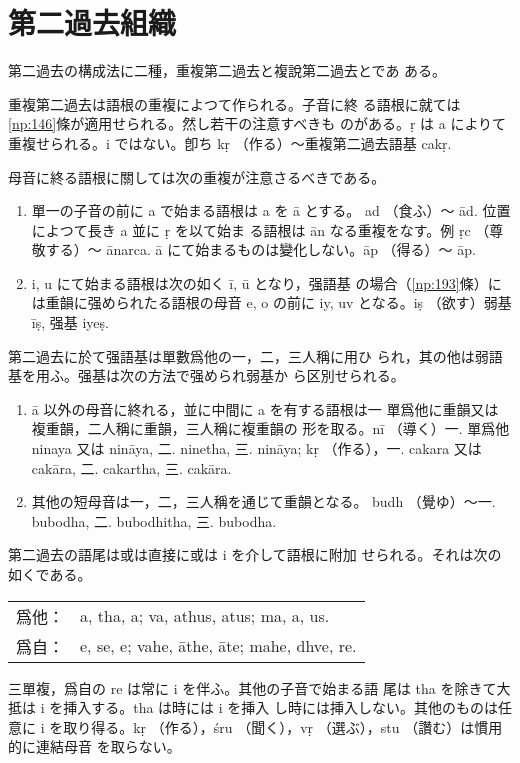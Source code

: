 \section{第二過去組織}
第二過去の構成法に二種，重複第二過去と複說第二過去とであ
ある。

\numberParagraph \label{np:192}
重複第二過去は語根の重複によつて作られる。子音に終
る語根に就ては \ref{np:146}條が適用せられる。然し若干の注意すべきも
のがある。ṛ は a によりて重複せられる。i ではない。卽ち kṛ
（作る）～重複第二過去語基 cakṛ.

母音に終る語根に關しては次の重複が注意さるべきである。
\begin{enumerate}[label=(\alph*)]
\item 單一の子音の前に a で始まる語根は a を ā とする。
ad （食ふ）～ ād. 位置によつて長き a 並に ṛ を以て始ま
る語根は ān なる重複をなす。例 ṛc （尊敬する）～ ānarca.
ā にて始まるものは變化しない。āp （得る）～ āp.
\item i, u にて始まる語根は次の如く ī, ū となり，强語基
の場合（\ref{np:193}條）には重韻に强められたる語根の母音 e, o
の前に iy, uv となる。iṣ （欲す）弱基 īṣ, 强基 iyeṣ.
\end{enumerate}

\numberParagraph \label{np:193}
第二過去に於て强語基は單數爲他の一，二，三人稱に用ひ
られ，其の他は弱語基を用ふ。强基は次の方法で强められ弱基か
ら区別せられる。
\begin{enumerate}[label=(\alph*)]
\item ā 以外の母音に終れる，並に中間に a を有する語根は一
單爲他に重韻又は複重韻，二人稱に重韻，三人稱に複重韻の
形を取る。nī （導く）一. 單爲他 ninaya 又は nināya, 二.
ninetha, 三. nināya; kṛ （作る），一. cakara 又は
cakāra, 二. cakartha, 三. cakāra.
\item 其他の短母音は一，二，三人稱を通じて重韻となる。
budh （覺ゆ）～一. bubodha, 二. bubodhitha, 三. bubodha.
\end{enumerate}

\numberParagraph \label{np:194}
第二過去の語尾は或は直接に或は i を介して語根に附加
せられる。それは次の如くである。

\begin{tabular}{ll}
  爲他： & a, tha, a; va, athus, atus; ma, a, us. \\
  爲自： & e, se, e; vahe, āthe, āte; mahe, dhve, re.
\end{tabular}

三單複，爲自の re は常に i を伴ふ。其他の子音で始まる語
尾は tha を除きて大抵は i を挿入する。tha は時には i を挿入
し時には挿入しない。其他のものは任意に i を取り得る。kṛ
（作る），śru （聞く），vṛ （選ぶ），stu （讚む）は慣用的に連結母音
を取らない。

